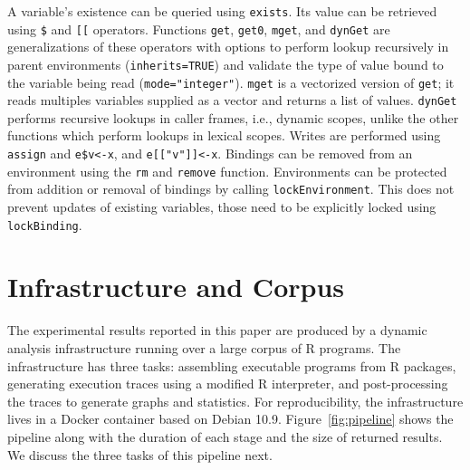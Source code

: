 \documentclass[sigplan,screen]{acmart}
\renewcommand{\c}[1]{\lstinline |#1|\xspace}
\newcommand{\subDollar}{\c{$}}
\newcommand{\subBracket}{\c{[[}}
\newcommand{\exist}{\c{exists}}
\newcommand{\get}{\c{get}}
\newcommand{\getZero}{\c{get0}}
\newcommand{\mget}{\c{mget}}
\newcommand{\dynGet}{\c{dynGet}}
\newcommand{\assign}{\c{assign}}
\newcommand{\remove}{\c{remove}}
\renewcommand{\rm}{\c{rm}}
\newcommand{\lockEnvironment}{\c{lockEnvironment}}
\newcommand{\lockBinding}{\c{lockBinding}}
\begin{document}
\noindent
A variable's existence can be queried using \exist. Its value can be retrieved
using \subDollar and \subBracket operators. Functions \get, \getZero, \mget, and \dynGet
are generalizations of these operators with options to perform lookup
recursively in parent environments (\c{inherits=TRUE}) and validate the type of
value bound to the variable being read (\c{mode="integer"}). \mget is a
vectorized version of \get; it reads multiples variables supplied as a vector
and returns a list of values. \dynGet performs recursive lookups in caller
frames, i.e., dynamic scopes, unlike the other functions which perform lookups
in lexical scopes. Writes are performed using \assign and \c{e$v<-x}, and
\c{e[["v"]]<-x}. Bindings can be removed from an environment using the \rm and
\remove function.
Environments can be protected from addition or removal of bindings by calling
\lockEnvironment. This does not prevent updates of existing variables, those
need to be explicitly locked using \lockBinding.


\section{Infrastructure and Corpus}

The experimental results reported in this paper are produced by a dynamic
analysis infrastructure running over a large corpus of R programs. The
infrastructure has three tasks: assembling executable programs from R packages,
generating execution traces using a modified R interpreter, and post-processing
the traces to generate graphs and statistics. For reproducibility, the
infrastructure lives in a Docker container based on Debian 10.9.
Figure~\ref{fig:pipeline} shows the pipeline along with the duration of
each stage and the size of returned results. We discuss the three tasks of this
pipeline next.
\end{document}
